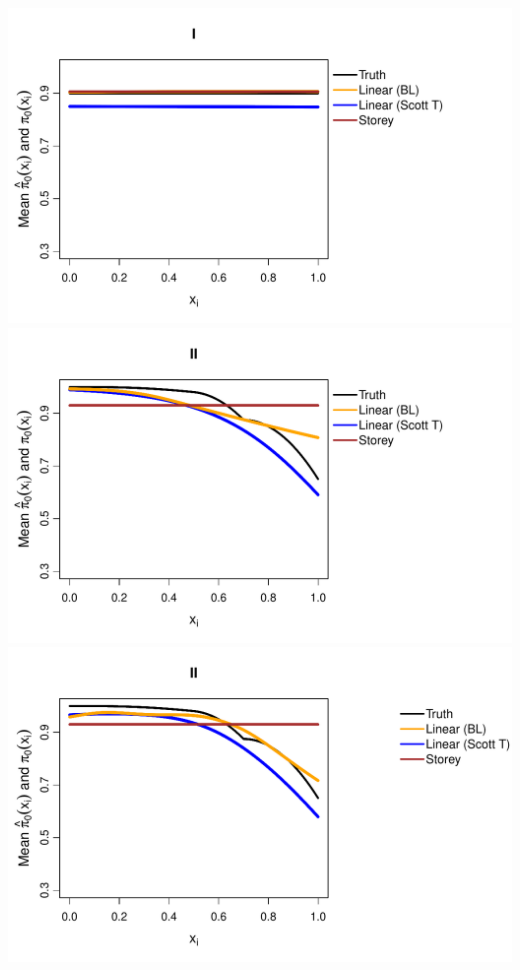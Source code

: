 \documentclass{article}\usepackage[]{graphicx}\usepackage[]{color}
\makeatletter
\def\maxwidth{ %
  \ifdim\Gin@nat@width>\linewidth
    \linewidth
  \else
    \Gin@nat@width
  \fi
}
\newenvironment{knitrout}{}{} %
\makeatother
\begin{document}
\begin{knitrout}
{\centering \includegraphics[width=\maxwidth]{Figures/plot_of_mean_estimates_t_10000-1} 
\includegraphics[width=\maxwidth]{Figures/plot_of_mean_estimates_t_10000-2} 
\includegraphics[width=\maxwidth]{Figures/plot_of_mean_estimates_t_10000-3} 
}
\end{knitrout}
\end{document}
